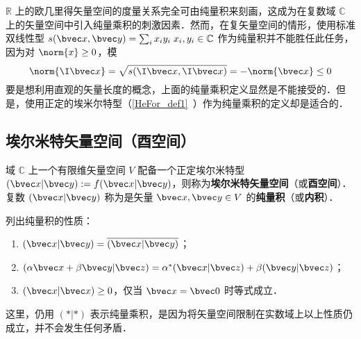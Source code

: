 
\begin{issues}
\issueTODO
\end{issues}

$\mathbb{R}$ 上的欧几里得矢量空间的度量关系完全可由纯量积来刻画，这成为在复数域 $\mathbb{C}$ 上的矢量空间中引入纯量乘积的刺激因素．然而，在复矢量空间的情形，使用标准双线性型 $s(\bvec x,\bvec y)=\sum_{i}x_iy_i\;x_i,y_i\in\mathbb{C}$ 作为纯量积并不能胜任此任务，因为对 $\norm{x}\geq0$，模
\begin{equation}
\norm{\I\bvec x}=\sqrt{s(\I\bvec x,\I\bvec x)}=-\norm{\bvec x}\leq0
\end{equation}
要是想利用直观的矢量长度的概念，上面的纯量乘积定义显然是不能接受的．但是，使用正定的埃米尔特型（\autoref{HeFor_def1}~）作为纯量乘积的定义却是适合的．
\subsection{埃尔米特矢量空间（酉空间）}
\begin{definition}{}
域 $\mathbb{C}$ 上一个有限维矢量空间 $V$ 配备一个正定埃尔米特型$(\bvec x|\bvec y):=f(\bvec x|\bvec y)$，则称为\textbf{埃尔米特矢量空间}（或\textbf{酉空间}）．复数 $(\bvec x|\bvec y)$ 称为是矢量 $\bvec x,\bvec y\in V$ 的\textbf{纯量积}（或\textbf{内积}）．
\end{definition}
列出纯量积的性质：
\begin{enumerate}
\item $(\bvec x|\bvec y)=\overline{(\bvec x|\bvec y)}$；
\item $(\alpha\bvec x+\beta\bvec y|\bvec z)=\alpha^*(\bvec x|\bvec z)+\beta(\bvec y|\bvec z)$；
\item $(\bvec x|\bvec x)\geq0$，仅当 $\bvec x=\bvec 0$ 时等式成立．
\end{enumerate}

这里，仍用 $(*|*)$ 表示纯量乘积，是因为将矢量空间限制在实数域上以上性质仍成立，并不会发生任何矛盾．

